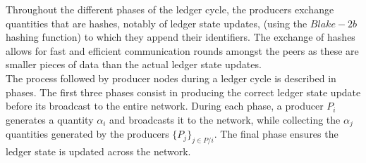 Throughout the different phases of the ledger cycle, the producers exchange quantities that are hashes, notably of ledger state updates, (using the $Blake-2b$ hashing function) to which they append their identifiers. The exchange of hashes allows for fast and efficient communication rounds amongst the peers as these are smaller pieces of data than the actual ledger state updates. \\

The process followed by producer nodes during a ledger cycle is described in phases. The first three phases consist in producing the correct ledger state update before its broadcast to the entire network. During each phase, a producer $P_i$ generates a quantity $\alpha_i$ and broadcasts it to the network, while collecting the $\alpha_j$ quantities generated by the producers $\{P_j\}_{j\in P/i}$. The final phase ensures the ledger state is updated across the network. 



